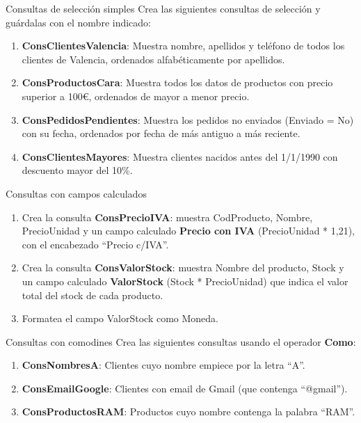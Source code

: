 \documentclass[12pt,a4paper]{article}
\begin{document}
\begin{practica}{Consultas de selección simples}
Crea las siguientes consultas de selección y guárdalas con el nombre indicado:
\begin{enumerate}
  \item \textbf{ConsClientesValencia}: Muestra nombre, apellidos y teléfono de todos los clientes de Valencia, ordenados alfabéticamente por apellidos.
  \item \textbf{ConsProductosCara}: Muestra todos los datos de productos con precio superior a 100€, ordenados de mayor a menor precio.
  \item \textbf{ConsPedidosPendientes}: Muestra los pedidos no enviados (Enviado = No) con su fecha, ordenados por fecha de más antiguo a más reciente.
  \item \textbf{ConsClientesMayores}: Muestra clientes nacidos antes del 1/1/1990 con descuento mayor del 10\%.
\end{enumerate}
\end{practica}

\begin{practica}{Consultas con campos calculados}
\begin{enumerate}
  \item Crea la consulta \textbf{ConsPrecioIVA}: muestra CodProducto, Nombre, PrecioUnidad y un campo calculado \textbf{Precio con IVA} (PrecioUnidad * 1,21), con el encabezado ``Precio c/IVA''.
  \item Crea la consulta \textbf{ConsValorStock}: muestra Nombre del producto, Stock y un campo calculado \textbf{ValorStock} (Stock * PrecioUnidad) que indica el valor total del stock de cada producto.
  \item Formatea el campo ValorStock como Moneda.
\end{enumerate}
\end{practica}

\begin{practica}{Consultas con comodines}
Crea las siguientes consultas usando el operador \textbf{Como}:
\begin{enumerate}
  \item \textbf{ConsNombresA}: Clientes cuyo nombre empiece por la letra ``A''.
  \item \textbf{ConsEmailGoogle}: Clientes con email de Gmail (que contenga ``@gmail'').
  \item \textbf{ConsProductosRAM}: Productos cuyo nombre contenga la palabra ``RAM''.
\end{enumerate}
\end{practica}
\end{document}
